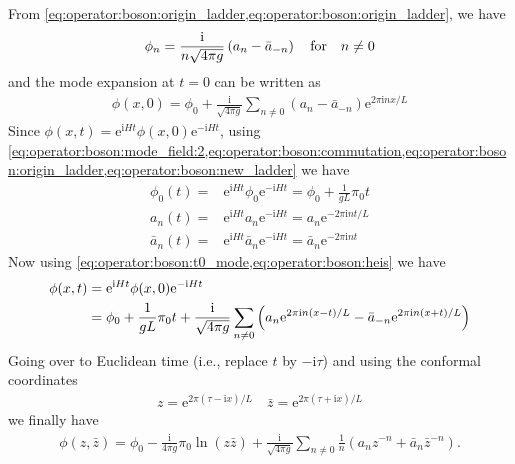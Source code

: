 \documentclass[10pt]{article}
\newcommand{\me}{\mathrm{e}}
\newcommand{\ii}{\mathrm{i}}
\begin{document}
From \cref{eq:operator:boson:origin_ladder,eq:operator:boson:origin_ladder}, we have
\begin{align}
    \phi_n=\frac{\ii}{n\sqrt{4\pi g}}\left(a_n-\bar{a}_{-n}\right)\qfor n\neq0
\end{align}
and the mode expansion at $t=0$ can be written as
\begin{align}
    \phi(x,0)=\phi_0+\frac{\ii}{\sqrt{4\pi g}}\sum_{n\neq0}\left(a_n-\bar{a}_{-n}\right)\me^{2\pi\ii nx/L}\label{eq:operator:boson:t0_mode}
\end{align}
Since $\phi(x,t)=\me^{\ii Ht}\phi(x,0)\me^{-\ii Ht}$, using \cref{eq:operator:boson:mode_field:2,eq:operator:boson:commutation,eq:operator:boson:origin_ladder,eq:operator:boson:new_ladder} we have
\begin{subequations}\label{eq:operator:boson:heis}
    \begin{align}
        \phi_0(t)=    & \me^{\ii Ht}\phi_0\me^{-\ii Ht}=\phi_0+\frac{1}{gL}\pi_0 t    \\
        a_n(t)=       & \me^{\ii Ht}a_n\me^{-\ii Ht}=a_n\me^{-2\pi\ii nt/L}           \\
        \bar{a}_n(t)= & \me^{\ii Ht}\bar{a}_n\me^{-\ii Ht}=\bar{a}_n\me^{-2\pi\ii nt}
    \end{align}
\end{subequations}
Now using \cref{eq:operator:boson:t0_mode,eq:operator:boson:heis} we have
\begin{align}
    \phi(x,t) & =\me^{\ii Ht}\phi(x,0)\me^{-\ii Ht}\notag                                                                                                   \\
              & =\phi_0+\frac{1}{gL}\pi_0 t+\frac{\ii}{\sqrt{4\pi g}}\sum_{n\neq0}\left(a_n\me^{2\pi\ii n(x-t)/L}-\bar{a}_{-n}\me^{2\pi\ii n(x+t)/L}\right)
\end{align}
Going over to Euclidean time (i.e., replace $t$ by $-\ii\tau$) and using the conformal coordinates
\begin{align}
    z=\me^{2\pi(\tau-\ii x)/L}\quad \bar{z}=\me^{2\pi(\tau+\ii x)/L}\label{eq:operator:boson:quan:trans}
\end{align}
we finally have
\begin{align}
    \phi(z,\bar{z})=\phi_0-\frac{\ii}{4\pi g}\pi_0\ln(z\bar{z})+\frac{\ii}{\sqrt{4\pi g}}\sum_{n\neq0}\frac{1}{n}\left(a_n z^{-n}+\bar{a}_n\bar{z}^{-n}\right).\label{eq:operator:boson:phi_expan}
\end{align}
\end{document}
